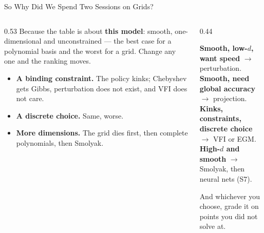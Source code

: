 \begin{frame}{So Why Did We Spend Two Sessions on Grids?}
\begin{columns}[T]
\begin{column}{0.53\textwidth}
\small
Because the table is about \textbf{this model}: smooth, one-dimensional and unconstrained --- the best case for a polynomial basis and the worst for a grid. Change any one and the ranking moves.
\medskip
\begin{itemize}\small
  \item \textbf{A binding constraint.} The policy kinks; Chebyshev gets Gibbs, perturbation does not exist, and VFI does not care.
  \item \textbf{A discrete choice.} Same, worse.
  \item \textbf{More dimensions.} The grid dies first, then complete polynomials, then Smolyak.
\end{itemize}
\end{column}
\begin{column}{0.44\textwidth}
\begin{conceptbox}[title=\textbf{The decision}]\footnotesize
\textbf{Smooth, low-$d$, want speed} $\to$ perturbation.\\[0.5mm]
\textbf{Smooth, need global accuracy} $\to$ projection.\\[0.5mm]
\textbf{Kinks, constraints, discrete choice} $\to$ VFI or EGM.\\[0.5mm]
\textbf{High-$d$ and smooth} $\to$ Smolyak, then neural nets (S7).
\end{conceptbox}
\medskip
\begin{cautionbox}\footnotesize
And whichever you choose, grade it on points you did not solve at.
\end{cautionbox}
\end{column}
\end{columns}
\vspace{1mm}
\end{frame}

